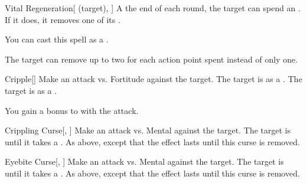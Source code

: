 \lowercase{\hypertarget{spell:Vital Regeneration}{}}\label{spell:Vital Regeneration}
\begin{attuneability}[Rank 5]{\hypertarget{spell:Vital Regeneration}{Vital Regeneration}}[ (target), ]
A the end of each round, the target can spend an .
If it does, it removes one of its .

You can cast this spell as a .

\rankline
{} The target can remove up to two  for each action point spent instead of only one.
\end{attuneability}
\vspace{0.25em}



\lowercase{\hypertarget{spell:Cripple}{}}\label{spell:Cripple}
\begin{freeability}[Rank 6]{\hypertarget{spell:Cripple}{Cripple}}[]
Make an attack vs. Fortitude against the target.
\hit The target is  as a .
\crit The target is  as a .

\rankline
{} You gain a  bonus to  with the attack.
\end{freeability}
\vspace{0.25em}



\lowercase{\hypertarget{spell:Crippling Curse}{}}\label{spell:Crippling Curse}
\begin{freeability}[Rank 8]{\hypertarget{spell:Crippling Curse}{Crippling Curse}}[, ]
Make an attack vs. Mental against the target.
\hit The target is  until it takes a .
\crit As above, except that the effect lasts until this curse is removed.
\end{freeability}
\vspace{0.25em}



\lowercase{\hypertarget{spell:Eyebite Curse}{}}\label{spell:Eyebite Curse}
\begin{freeability}[Rank 8]{\hypertarget{spell:Eyebite Curse}{Eyebite Curse}}[, ]
Make an attack vs. Mental against the target.
\hit The target is  until it takes a .
\crit As above, except that the effect lasts until this curse is removed.
\end{freeability}
\vspace{0.25em}



